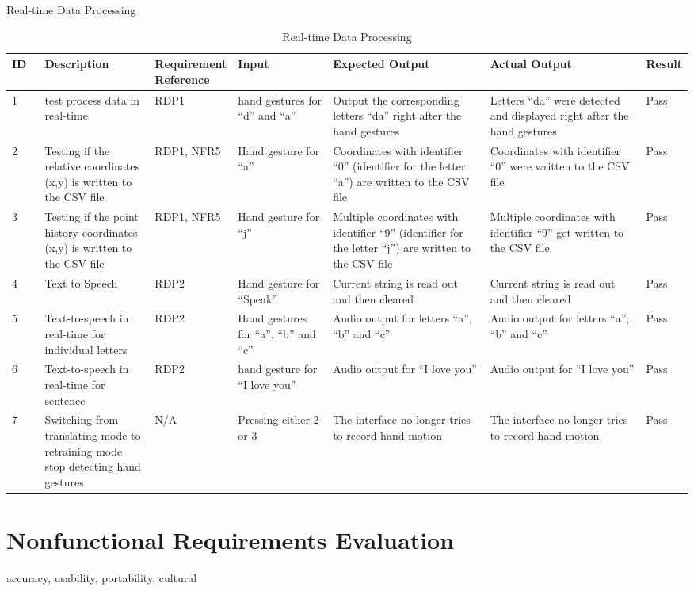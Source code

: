 \documentclass[12pt, titlepage]{article}
\begin{document}
\newpage
\centerline{Real-time Data Processing}

\begin{landscape}
\renewcommand{\arraystretch}{1.2}
\noindent \begin{longtable}{p{0.05\linewidth}|p{0.17\linewidth}|p{0.1\linewidth}|p{0.15\linewidth}|p{0.25\linewidth}|p{0.25\linewidth}|p{0.05\linewidth}}
\hline
\textbf{ID} & \textbf{Description} & \textbf{Requirement Reference} & \textbf{Input} & \textbf{Expected Output} & \textbf{Actual Output} & \textbf{Result}\\
\hline
1 & test process data in real-time & RDP1 & hand gestures for “d” and “a” & Output the corresponding letters “da” right after the hand gestures & Letters “da” were detected and displayed right after the hand gestures & Pass\\ \hline
2 & Testing if the relative coordinates (x,y) is written to the CSV file & RDP1, NFR5 & Hand gesture for “a” & Coordinates with identifier “0” (identifier for the letter “a”) are written to the CSV file & Coordinates with identifier “0” were written to the CSV file & Pass\\ \hline
3 & Testing if the point history coordinates (x,y) is written to the CSV file & RDP1, NFR5 & Hand gesture for “j” & Multiple coordinates with identifier “9” (identifier for the letter “j”) are written to the CSV file & Multiple coordinates with identifier “9” get written to the CSV file & Pass\\ \hline
4 & Text to Speech & RDP2 & Hand gesture for “Speak” & Current string is read out and then cleared & Current string is read out and then cleared & Pass\\ \hline
5 & Text-to-speech in real-time for individual letters & RDP2 & Hand gestures for “a”, “b” and “c” & Audio output for letters “a”, “b” and “c” & Audio output for letters “a”, “b” and “c” & Pass\\ \hline
6 & Text-to-speech in real-time for sentence & RDP2 & hand gesture for “I love you” & Audio output for “I love you” & Audio output for “I love you” & Pass\\ \hline
7 & Switching from translating mode to retraining mode stop detecting hand gestures & N/A & Pressing either 2 or 3 & The interface no longer tries to record hand motion & The interface no longer tries to record hand motion & Pass
\hline
\caption{Real-time Data Processing}
\end{longtable}
\end{landscape}

\section{Nonfunctional Requirements Evaluation}
\newpage
\centerline{accuracy, usability, portability, cultural}
\end{document}
